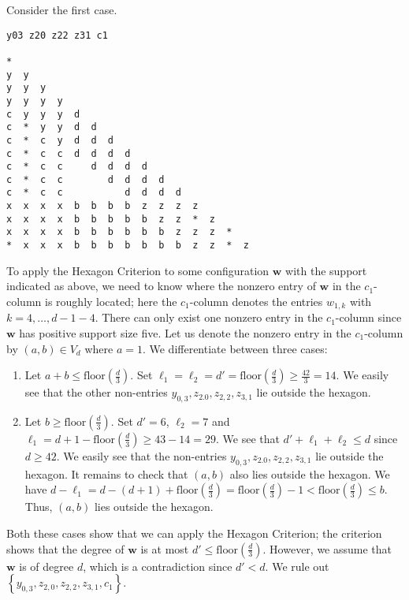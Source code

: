 \begin{example}\label{ex:324jjhsdbvuysduyg2yrguy23hriuwfiueonw}
    Consider the first case.
    
\begin{verbatim}
y03 z20 z22 z31 c1

*  
y  y  
y  y  y  
y  y  y  y  
c  y  y  y  d  
c  *  y  y  d  d  
c  *  c  y  d  d  d  
c  *  c  c  d  d  d  d  
c  *  c  c     d  d  d  d  
c  *  c  c        d  d  d  d  
c  *  c  c           d  d  d  d  
x  x  x  x  b  b  b  b  z  z  z  z  
x  x  x  x  b  b  b  b  b  z  z  *  z  
x  x  x  x  b  b  b  b  b  b  z  z  z  *  
*  x  x  x  b  b  b  b  b  b  b  z  z  *  z  
\end{verbatim}
To apply the Hexagon Criterion to some configuration \( \mathbf{w} \) with the support indicated as above, we need to know where the nonzero entry of \( \mathbf{w} \) in the \( c_1 \)-column is roughly located; here the \( c_1 \)-column denotes the entries \( w_{1,k} \) with \( k = 4, \dots, d - 1 - 4 \). There can only exist one nonzero entry in the \( c_1 \)-column since \( \mathbf{w} \) has positive support size five. Let us denote the nonzero entry in the \( c_1 \)-column by \( (a,b) \in V_d \) where \( a = 1 \). We differentiate between three cases:
\begin{enumerate}
    \item Let \( a + b \leq \mathrm{floor}(\frac{d}{3})\). Set \( \ell_1 = \ell_2 = d' =  \mathrm{floor}(\frac{d}{3}) \geq \frac{42}{3} = 14 \). We easily see that the other non-entries \( y_{0,3}, z_{2.0}, z_{2,2}, z_{3,1} \) lie outside the hexagon.
    \item Let \( b \geq \mathrm{floor}(\frac{d}{3})  \). Set \( d' = 6 \), \( \ell_2 = 7 \) and \( \ell_1 = d + 1 - \mathrm{floor}(\frac{d}{3}) \geq 43 - 14 = 29 \). We see that \( d' + \ell_1 + \ell_2 \leq d \) since \( d \geq 42 \). We easily see that the non-entries \( y_{0,3}, z_{2.0}, z_{2,2}, z_{3,1} \) lie outside the hexagon. It remains to check that \( (a,b) \) also lies outside the hexagon. We have \( d - \ell_1 = d - (d + 1) + \mathrm{floor}(\frac{d}{3}) =\mathrm{floor}(\frac{d}{3}) - 1 < \mathrm{floor}(\frac{d}{3}) \leq b \). Thus, \( (a,b) \) lies outside the hexagon.
\end{enumerate}
Both these cases show that we can apply the Hexagon Criterion; the criterion shows that the degree of \( \mathbf{w} \) is at most \( d' \leq \mathrm{floor}(\frac{d}{3}) \). However, we assume that \( \mathbf{w} \) is of degree \( d \), which is a contradiction since \( d' < d \). We rule out \( \left\{ y_{0,3}, z_{2,0}, z_{2,2}, z_{3,1}, c_1 \right\} \).
\end{example}

